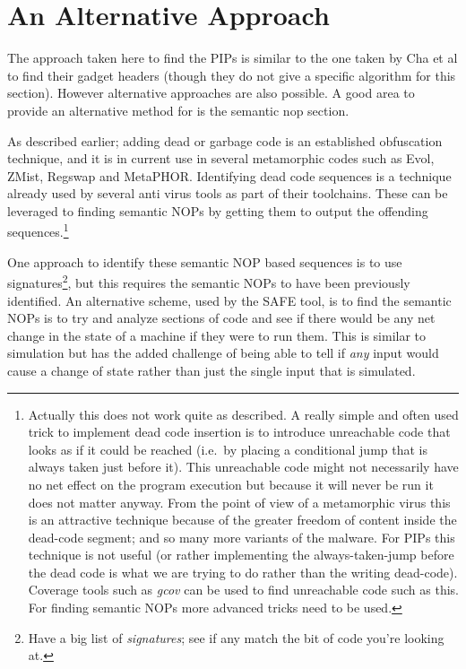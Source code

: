 \documentclass[10pt,]{book}
\begin{document}
\section{An Alternative Approach}

The approach taken here to find the PIPs is similar to the one taken by
Cha et al\autocite{Cha:2010uh} to find their gadget headers (though they
do not give a specific algorithm for this section). However alternative
approaches are also possible. A good area to provide an alternative
method for is the semantic nop section.

As described earlier; adding dead or garbage code is an established
obfuscation technique, and it is in current use in several metamorphic
codes such as Evol, ZMist, Regswap and
MetaPHOR\autocite{Borello:2008vx}. Identifying dead code sequences is a
technique already used by several anti virus tools as part of their
toolchains. These can be leveraged to finding semantic NOPs by getting
them to output the offending sequences.\footnote{Actually this does not
  work quite as described. A really simple and often used trick to
  implement dead code insertion is to introduce unreachable code that
  looks as if it could be reached (i.e.~by placing a conditional jump
  that is always taken just before it). This unreachable code might not
  necessarily have no net effect on the program execution but because it
  will never be run it does not matter anyway. From the point of view of
  a metamorphic virus this is an attractive technique because of the
  greater freedom of content inside the dead-code segment; and so many
  more variants of the malware. For PIPs this technique is not useful
  (or rather implementing the always-taken-jump before the dead code is
  what we are trying to do rather than the writing dead-code). Coverage
  tools such as \emph{gcov} can be used to find unreachable code such as
  this.\autocite{Administrator:ul} For finding semantic NOPs more
  advanced tricks need to be used.}

One approach to identify these semantic NOP based sequences is to use
signatures\footnote{Have a big list of \emph{signatures}; see if any
  match the bit of code you're looking at.}, but this requires the
semantic NOPs to have been previously identified. An alternative scheme,
used by the SAFE tool\autocite{Christodorescu:2006vz}, is to find the
semantic NOPs is to try and analyze sections of code and see if there
would be any net change in the state of a machine if they were to run
them. This is similar to simulation but has the added challenge of being
able to tell if \emph{any} input would cause a change of state rather
than just the single input that is simulated.
\end{document}
